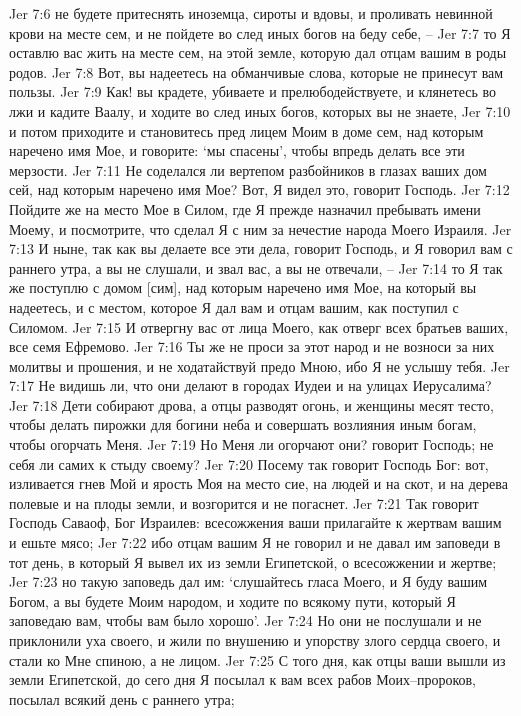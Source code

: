 Jer 7:6  не будете притеснять иноземца, сироты и вдовы, и проливать невинной крови на месте сем, и не пойдете во след иных богов на беду себе, --
Jer 7:7  то Я оставлю вас жить на месте сем, на этой земле, которую дал отцам вашим в роды родов.
Jer 7:8  Вот, вы надеетесь на обманчивые слова, которые не принесут вам пользы.
Jer 7:9  Как! вы крадете, убиваете и прелюбодействуете, и клянетесь во лжи и кадите Ваалу, и ходите во след иных богов, которых вы не знаете,
Jer 7:10  и потом приходите и становитесь пред лицем Моим в доме сем, над которым наречено имя Мое, и говорите: `мы спасены', чтобы впредь делать все эти мерзости.
Jer 7:11  Не соделался ли вертепом разбойников в глазах ваших дом сей, над которым наречено имя Мое? Вот, Я видел это, говорит Господь.
Jer 7:12  Пойдите же на место Мое в Силом, где Я прежде назначил пребывать имени Моему, и посмотрите, что сделал Я с ним за нечестие народа Моего Израиля.
Jer 7:13  И ныне, так как вы делаете все эти дела, говорит Господь, и Я говорил вам с раннего утра, а вы не слушали, и звал вас, а вы не отвечали, --
Jer 7:14  то Я так же поступлю с домом [сим], над которым наречено имя Мое, на который вы надеетесь, и с местом, которое Я дал вам и отцам вашим, как поступил с Силомом.
Jer 7:15  И отвергну вас от лица Моего, как отверг всех братьев ваших, все семя Ефремово.
Jer 7:16  Ты же не проси за этот народ и не возноси за них молитвы и прошения, и не ходатайствуй предо Мною, ибо Я не услышу тебя.
Jer 7:17  Не видишь ли, что они делают в городах Иудеи и на улицах Иерусалима?
Jer 7:18  Дети собирают дрова, а отцы разводят огонь, и женщины месят тесто, чтобы делать пирожки для богини неба и совершать возлияния иным богам, чтобы огорчать Меня.
Jer 7:19  Но Меня ли огорчают они? говорит Господь; не себя ли самих к стыду своему?
Jer 7:20  Посему так говорит Господь Бог: вот, изливается гнев Мой и ярость Моя на место сие, на людей и на скот, и на дерева полевые и на плоды земли, и возгорится и не погаснет.
Jer 7:21  Так говорит Господь Саваоф, Бог Израилев: всесожжения ваши прилагайте к жертвам вашим и ешьте мясо;
Jer 7:22  ибо отцам вашим Я не говорил и не давал им заповеди в тот день, в который Я вывел их из земли Египетской, о всесожжении и жертве;
Jer 7:23  но такую заповедь дал им: `слушайтесь гласа Моего, и Я буду вашим Богом, а вы будете Моим народом, и ходите по всякому пути, который Я заповедаю вам, чтобы вам было хорошо'.
Jer 7:24  Но они не послушали и не приклонили уха своего, и жили по внушению и упорству злого сердца своего, и стали ко Мне спиною, а не лицом.
Jer 7:25  С того дня, как отцы ваши вышли из земли Египетской, до сего дня Я посылал к вам всех рабов Моих--пророков, посылал всякий день с раннего утра;
